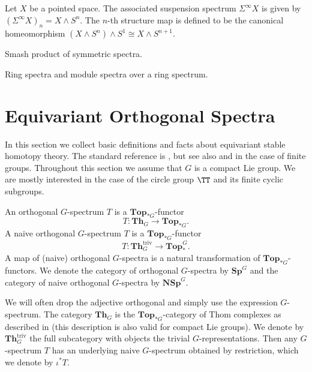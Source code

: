 \begin{bsp}
\end{bsp}

\begin{bsp}
Let $X$ be a pointed space. The associated suspension spectrum $\Sigma^\infty X$ is given
by $(\Sigma^\infty X)_n= X\wedge S^n$. The $n$-th structure map is defined to be the canonical homeomorphism
$(X\wedge S^n)\wedge S^1\cong X\wedge S^{n+1}$.
\end{bsp}
\begin{mydef}
Smash product of symmetric spectra.
\end{mydef}

\begin{mydef}
Ring spectra and module spectra over a ring spectrum.
\end{mydef}

\begin{bsp}

\end{bsp}

\section{Equivariant Orthogonal Spectra}
In this section we collect basic definitions and facts about equivariant 
stable homotopy theory. The standard reference is \cite{mandellmay},
but see also \cite{schwedeequivariant} and \cite[Section~3-7]{rvadams}
in the case of finite groups. 
Throughout this section we assume that $G$ is a compact Lie group.
We are mostly interested in the case of the circle group $\TT$ and its
finite cyclic subgroups. 

\begin{mydef}
An orthogonal $G$-spectrum $T$ is a $\mathbf{Top}_{\ast G}$-functor
\[
T:\mathbf{Th}_G\to \mathbf{Top}_{\ast G}.
\]
A naive orthogonal $G$-spectrum $T$ is a $\mathbf{Top}_{\ast G}$-functor
\[
T:\mathbf{Th}^{\mathrm{triv}}_G\to \mathbf{Top}^G_{\ast}.
\]
A map of (naive) orthogonal $G$-spectra is a natural transformation of
$\mathbf{Top}_{\ast G}$-functors. We denote the category of orthogonal
$G$-spectra by $\mathbf{Sp}^G$ and the category of
naive orthogonal $G$-spectra by $\mathbf{NSp}^G$.
\end{mydef}
We will often drop the adjective orthogonal and simply use the expression
$G$-spectrum. The category $\mathbf{Th}_G$ is the $\mathbf{Top}_{\ast G}$-category of
Thom complexes  as described in  \cite[Section~3]{rvadams} (this description
is also valid for compact Lie groups).
We denote by $\mathbf{Th}_G^{\mathrm{triv}}$ the full subcategory
with objects the trivial $G$-representations. Then any $G$-spectrum
$T$ has an underlying naive $G$-spectrum obtained by restriction,
which we denote by $\iota^\ast T$.


